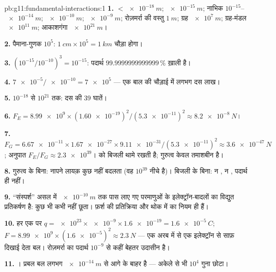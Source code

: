 \begin{solution}{pb:g11:fundamental-interactions:1}
\textbf{1.}  $< \qty{e-18}{m}$;  $\qty{e-15}{m}$;
नाभिक $10^{-15}$--$\qty{e-14}{m}$;  $\qty{e-10}{m}$; 
$\qty{e-9}{m}$; रोज़मर्रा की वस्तु $\qty{1}{m}$; ग्रह $\qty{e7}{m}$; ग्रह-मंडल $\qty{e11}{m}$;
आकाशगंगा $\qty{e21}{m}$।

\textbf{2.} पैमाना-गुणक $10^{5}$:  $\qty{1}{cm} \times 10^{5} = \qty{1}{km}$ चौड़ा होगा।

\textbf{3.} $(10^{-15}/10^{-10})^3 = 10^{-15}$: पदार्थ $\num{99.9999999999999}\,\%$ ख़ाली है।

\textbf{4.} $\num{7e-5}/\num{e-10} = \num{7e5}$  --- एक बाल की चौड़ाई में लगभग दस लाख।

\textbf{5.} $10^{-18}$ से $10^{21}$ तक: दस की $39$ घातें।

\textbf{6.} $F_E = \num{8.99e9} \times (\num{1.60e-19})^2 /
(\num{5.3e-11})^2 \approx \qty{8.2e-8}{N}$।

\textbf{7.} $F_G = \num{6.67e-11} \times \num{1.67e-27} \times
\num{9.11e-31}/(\num{5.3e-11})^2 \approx \qty{3.6e-47}{N}$; अनुपात $F_E/F_G \approx \num{2.3e39}$।  को बिजली थामे रखती है;
गुरुत्व केवल तमाशबीन है।

\textbf{8.} गुरुत्व के बिना: नापने लायक़ कुछ नहीं बदलता (वह $10^{39}$ नीचे है)।
बिजली के बिना: न , न , पदार्थ ही नहीं।

\textbf{9.} ``संस्पर्श'' असल में $\qty{e-10}{m}$ तक पास लाए गए परमाणुओं के
इलेक्ट्रॉन-बादलों का विद्युत प्रतिकर्षण है: कुछ भी कभी नहीं छूता। फ़र्श की
प्रतिक्रिया और  थोक में  का नियम ही हैं।

\textbf{10.} हर एक पर $q = \num{e23} \times \num{e-9} \times \num{1.6e-19} =
\qty{1.6e-5}{C}$; $F = \num{8.99e9} \times (\num{1.6e-5})^2 \approx \qty{2.3}{N}$ --- एक अरब में से एक इलेक्ट्रॉन से
साफ़ दिखाई देता बल। रोज़मर्रा का पदार्थ $10^{-9}$ से कहीं बेहतर
उदासीन है।

\textbf{11.} । प्रबल बल लगभग
$\qty{e-14}{m}$ से आगे  के बाहर है --- अकेले  से भी
$10^{4}$ गुना छोटा।


\end{solution}
